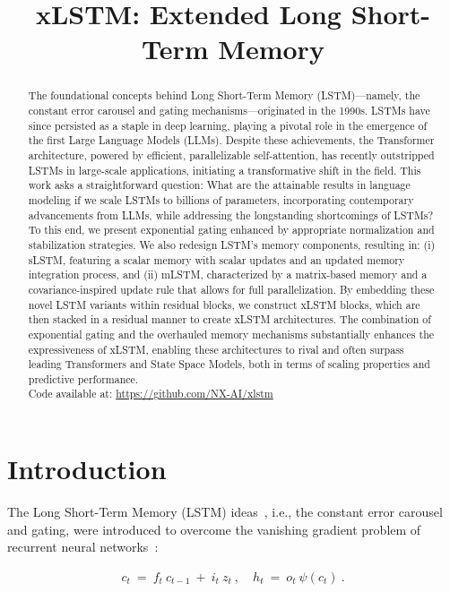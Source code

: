 \title{xLSTM: Extended Long Short-Term Memory}

\begin{abstract}
The foundational concepts behind Long Short-Term Memory (LSTM)—namely, the constant error carousel and gating mechanisms—originated in the 1990s. LSTMs have since persisted as a staple in deep learning, playing a pivotal role in the emergence of the first Large Language Models (LLMs). Despite these achievements, the Transformer architecture, powered by efficient, parallelizable self-attention, has recently outstripped LSTMs in large-scale applications, initiating a transformative shift in the field. This work asks a straightforward question: What are the attainable results in language modeling if we scale LSTMs to billions of parameters, incorporating contemporary advancements from LLMs, while addressing the longstanding shortcomings of LSTMs? To this end, we present exponential gating enhanced by appropriate normalization and stabilization strategies. We also redesign LSTM’s memory components, resulting in: (i) sLSTM, featuring a scalar memory with scalar updates and an updated memory integration process, and (ii) mLSTM, characterized by a matrix-based memory and a covariance-inspired update rule that allows for full parallelization. By embedding these novel LSTM variants within residual blocks, we construct xLSTM blocks, which are then stacked in a residual manner to create xLSTM architectures. The combination of exponential gating and the overhauled memory mechanisms substantially enhances the expressiveness of xLSTM, enabling these architectures to rival and often surpass leading Transformers and State Space Models, both in terms of scaling properties and predictive performance.\\
Code available at: \url{https://github.com/NX-AI/xlstm}
\end{abstract}

\section{Introduction}
\label{sec:intro}

The Long Short-Term Memory (LSTM) ideas~\citep{Hochreiter:91,Hochreiter:97nips,Hochreiter:97}, i.e., the constant error carousel and gating, were introduced to overcome the vanishing gradient problem of recurrent neural networks~\citep{Hochreiter:91,Hochreiter:00book}:

\begin{align}
\label{eq:lstm_idea}
  c_t \ = \ f_t \ c_{t-1} \ + \ 
          i_t \  z_t \ , \quad  
          h_t \ = \ o_t \ \psi({c_t}) \ . 
\end{align}

